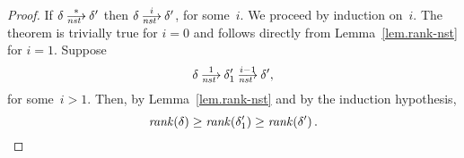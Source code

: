 
\thmranknstx*
\begin{proof}
  If $\delta\nst[*]\delta'$ then $\delta\nst[i]\delta'$, for some~$i$.  We
  proceed by induction on~$i$.  The theorem is trivially true for $i=0$ and
  follows directly from Lemma~\ref{lem.rank-nst} for $i=1$.  Suppose
  \[
    \delta\nst[1]\delta_1'\nst[i-1]\delta',
  \]
  for some~$i>1$.  Then, by Lemma~\ref{lem.rank-nst} and by the induction
  hypothesis,
  \[
    \operatorname{\mathit{rank}}(\delta)\ge\operatorname{\mathit{rank}}(\delta_1')\ge\operatorname{\mathit{rank}}(\delta')\,.\qedhere
  \]
\end{proof}




